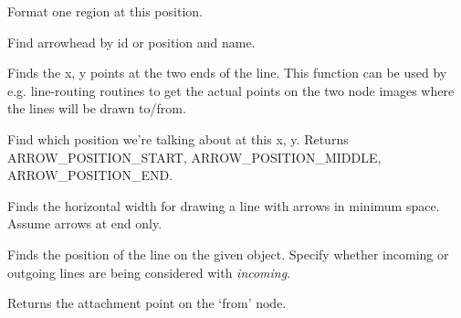 

Format one region at this position.




Find arrowhead by id or position and name.



Finds the x, y points at the two ends of the line. This function can be
used by e.g. line-routing routines to get the actual points on the two
node images where the lines will be drawn to/from.



Find which position we're talking about at this x, y.
Returns ARROW\_POSITION\_START, ARROW\_POSITION\_MIDDLE, ARROW\_POSITION\_END.



Finds the horizontal width for drawing a line with arrows in minimum
space. Assume arrows at end only.



Finds the position of the line on the given object. Specify whether incoming or outgoing lines are
being considered with {\it incoming}.



Returns the attachment point on the `from' node.


